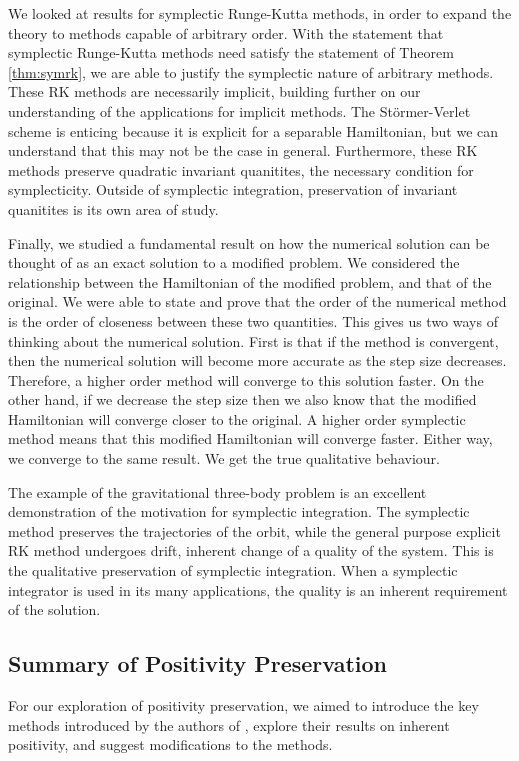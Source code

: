We looked at results for symplectic Runge-Kutta methods, in order to expand the theory to methods capable of arbitrary order.
With the statement that symplectic Runge-Kutta methods need satisfy the statement of Theorem \ref{thm:symrk}, we are able to justify the symplectic nature of arbitrary methods.
These RK methods are necessarily implicit, building further on our understanding of the applications for implicit methods.
The St\"ormer-Verlet scheme is enticing because it is explicit for a separable Hamiltonian, but we can understand that this may not be the case in general.
Furthermore, these RK methods preserve quadratic invariant quanitites, the necessary condition for symplecticity.
Outside of symplectic integration, preservation of invariant quanitites is its own area of study.

Finally, we studied a fundamental result on how the numerical solution can be thought of as an exact solution to a modified problem.
We considered the relationship between the Hamiltonian of the modified problem, and that of the original.
We were able to state and prove that the order of the numerical method is the order of closeness between these two quantities.
This gives us two ways of thinking about the numerical solution.
First is that if the method is convergent, then the numerical solution will become more accurate as the step size decreases.
Therefore, a higher order method will converge to this solution faster.
On the other hand, if we decrease the step size then we also know that the modified Hamiltonian will converge closer to the original.
A higher order symplectic method means that this modified Hamiltonian will converge faster.
Either way, we converge to the same result. We get the true qualitative behaviour.

The example of the gravitational three-body problem is an excellent demonstration of the motivation for symplectic integration.
The symplectic method preserves the trajectories of the orbit,
while the general purpose explicit RK method undergoes drift, inherent change of a quality of the system.
This is the qualitative preservation of symplectic integration.
When a symplectic integrator is used in its many applications, the quality is an inherent requirement of the solution.

\subsection{Summary of Positivity Preservation}
For our exploration of positivity preservation, we aimed to introduce the key methods introduced by the authors of \cite{blanes_pos_2022},
explore their results on inherent positivity, and suggest modifications to the methods.

